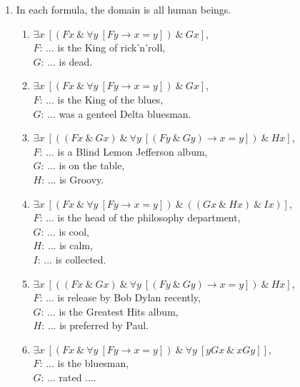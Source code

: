 \documentclass[a4paper,12pt]{article}
\newcommand{\ra}{\rightarrow}
\newcommand{\ta}{ \ \& \ }
\newcommand{\all}{\forall}
\newcommand{\ex}{\exists}
\begin{document}
    \begin{enumerate}[label=\arabic*,leftmargin=*]
        \item In each formula, the domain is all human beings.
            \begin{enumerate}[label=(\roman*)]
                \item $\ex x \ [(Fx \ta \all y \ [Fy \ra x=y]) \ta Gx]$,\\
                    $F$: ... is the King of rick'n'roll,\\
                    $G$: ... is dead.
                \item $\ex x \ [(Fx \ta \all y \ [Fy \ra x=y]) \ta Gx]$,\\
                    $F$: ... is the King of the blues,\\
                    $G$: ... was a genteel Delta bluesman.
                \item $\ex x \ [((Fx \ta Gx) \ta \all y \ [(Fy \ta Gy) \ra x=y]) \ta Hx]$,\\
                    $F$: ... is a Blind Lemon Jefferson album,\\
                    $G$: ... is on the table,\\
                    $H$: ... is Groovy.
                \item $\ex x \ [(Fx \ta \all y \ [Fy \ra x=y]) \ta ((Gx \ta Hx) \ta Ix)]$,\\
                    $F$: ... is the head of the philosophy department,\\
                    $G$: ... is cool,\\
                    $H$: ... is calm,\\
                    $I$: ... is collected.
                \item $\ex x \ [((Fx \ta Gx) \ta \all y \ [(Fy \ta Gy) \ra x=y]) \ta Hx]$,\\
                    $F$: ... is release by Bob Dylan recently,\\
                    $G$: ... is the Greatest Hits album,\\
                    $H$: ... is preferred by Paul.
                \item $\ex x \ [(Fx \ta \all y \ [Fy \ra x=y]) \ta \all y \ [yGx \ta xGy]]$,\\
                    $F$: ... is the bluesman,\\
                    $G$: ... rated ....
            \end{enumerate}
    \end{enumerate}
\end{document}
